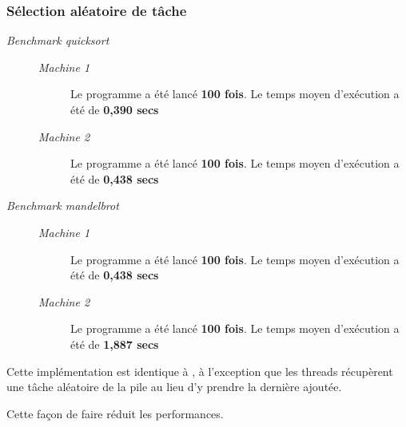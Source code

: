 \documentclass[a4paper]{article}
\def\mone{\textit{Machine 1}} %
\def\mtwo{\textit{Machine 2}} %
\def\bone{\textit{Benchmark quicksort}}
\def\btwo{\textit{Benchmark mandelbrot}}
\newcommand{\docref}[1]{\textit{\nameref{#1}}} %
\begin{document}
\subsubsection{Sélection aléatoire de tâche}
\begin{description}
  \item[\bone] \hspace{1em}
        \begin{description}
          \item[\mone] Le programme a été lancé \textbf{100 fois}.
                Le temps moyen d'exécution a été de \textbf{0,390 secs}
          \item[\mtwo] Le programme a été lancé \textbf{100 fois}.
                Le temps moyen d'exécution a été de \textbf{0,438 secs}
        \end{description}

  \item[\btwo] \hspace{1em}
        \begin{description}
          \item[\mone] Le programme a été lancé \textbf{100 fois}.
                Le temps moyen d'exécution a été de \textbf{0,438 secs}
          \item[\mtwo] Le programme a été lancé \textbf{100 fois}.
                Le temps moyen d'exécution a été de \textbf{1,887 secs}
        \end{description}
\end{description}

Cette implémentation est identique à \docref{stats:stack}, à l'exception que
les threads récupèrent une tâche aléatoire de la pile au lieu d'y prendre
la dernière ajoutée.

Cette façon de faire réduit les performances.
\end{document}
